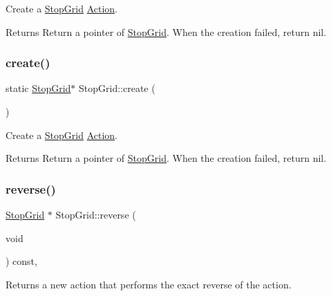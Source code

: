Create a \hyperlink{classStopGrid}{Stop\+Grid} \hyperlink{classAction}{Action}. 

\begin{DoxyReturn}{Returns}
Return a pointer of \hyperlink{classStopGrid}{Stop\+Grid}. When the creation failed, return nil. 
\end{DoxyReturn}
\mbox{\label{classStopGrid_a2f8d55f74d7fa184b7723f8e6e026c47}} 
\subsubsection{\texorpdfstring{create()}{create()}\hspace{0.1cm}{\footnotesize\ttfamily [2/2]}}
{\footnotesize\ttfamily static \hyperlink{classStopGrid}{Stop\+Grid}$\ast$ Stop\+Grid\+::create (\begin{DoxyParamCaption}{ }\end{DoxyParamCaption})\hspace{0.3cm}{\ttfamily [static]}}



Create a \hyperlink{classStopGrid}{Stop\+Grid} \hyperlink{classAction}{Action}. 

\begin{DoxyReturn}{Returns}
Return a pointer of \hyperlink{classStopGrid}{Stop\+Grid}. When the creation failed, return nil. 
\end{DoxyReturn}
\mbox{\label{classStopGrid_a02dcf952035340874d9b8a207e0c4da9}} 
\subsubsection{\texorpdfstring{reverse()}{reverse()}\hspace{0.1cm}{\footnotesize\ttfamily [1/2]}}
{\footnotesize\ttfamily \hyperlink{classStopGrid}{Stop\+Grid} $\ast$ Stop\+Grid\+::reverse (\begin{DoxyParamCaption}\item[{void}]{ }\end{DoxyParamCaption}) const\hspace{0.3cm}{\ttfamily [override]}, {\ttfamily [virtual]}}

Returns a new action that performs the exact reverse of the action.


